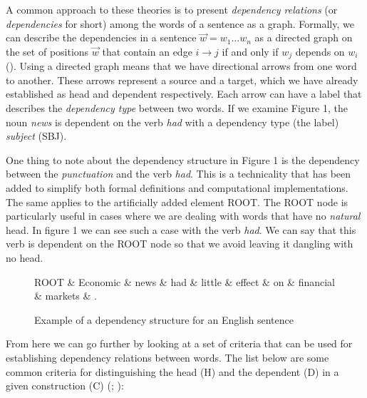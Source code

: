 \documentclass[10pt]{article}
\begin{document}
A common approach to these theories is to present \textit{dependency relations} (or \textit{dependencies} for short) among the words of a sentence as a graph. Formally, we can describe the dependencies in a sentence $\vec{w} = w_1 ... w_n$ as a directed graph on the set of positions $\vec{w}$ that contain an edge $i \rightarrow j$ if and only if $w_j$ depends on $w_i$ (\cite{kuhlmann2010dependency}). Using a directed graph means that we have directional arrows from one word to another. These arrows represent a source and a target, which we have already established as head and dependent respectively. Each arrow can have a label that describes the \textit{dependency type} between two words. If we examine Figure 1, the noun \textit{news} is dependent on the verb \textit{had} with a dependency type (the label) \textit{subject} (SBJ). 

One thing to note about the dependency structure in Figure 1 is the dependency between the \textit{punctuation} and the verb \textit{had}. This is a technicality that has been added to simplify both formal definitions and computational implementations. The same applies to the artificially added element ROOT. The ROOT node is particularly useful in cases where we are dealing with words that have no \textit{natural} head. In figure 1 we can see such a case with the verb \textit{had}. We can say that this verb is dependent on the ROOT node so that we avoid leaving it dangling with no head.

\begin{figure}
\begin{dependency}[theme = simple]
\begin{deptext}[column sep=1em]
ROOT \& Economic \& news \& had \& little \& effect \& on \& financial \& markets \& . \\
\end{deptext}
\end{dependency}
\caption{Example of a dependency structure for an English sentence}
\end{figure}

From here we can go further by looking at a set of criteria that can be used for establishing dependency relations between words. The list below are some common criteria for distinguishing the head (H) and the dependent (D) in a given construction (C) (\cite{Nivre05dependencygrammar}; \cite{ZwickyHead}):
\end{document}
